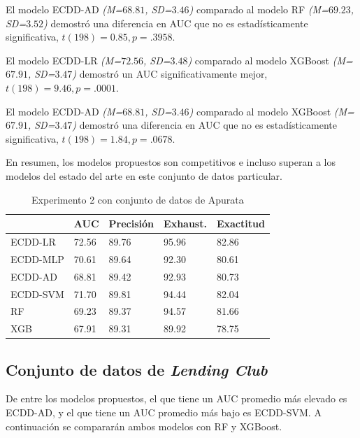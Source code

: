 El modelo ECDD-AD  \textit{(M=$68.81$, SD=$3.46$)} comparado al modelo \ac{RF} \textit{(M=$69.23$, SD=$3.52$)} demostró una diferencia en \ac{AUC} que no es estadísticamente significativa, $t(198)=0.85, p=.3958$.

El modelo ECDD-LR \textit{(M=$72.56$, SD=$3.48$)} comparado al modelo \ac{XGBoost} \textit{(M=$67.91$, SD=$3.47$)} demostró un \ac{AUC} significativamente mejor, $t(198)=9.46, p=.0001$.

El modelo ECDD-AD \textit{(M=$68.81$, SD=$3.46$)} comparado al modelo \ac{XGBoost} \textit{(M=$67.91$, SD=$3.47$)} demostró una diferencia en \ac{AUC} que no es estadísticamente significativa, $t(198)=1.84, p=.0678$.

En resumen, los modelos propuestos son competitivos e incluso superan a los modelos del estado del arte en este conjunto de datos particular.

\begin{table}[htbp]
\centering
\caption{Experimento 2 con conjunto de datos de Apurata}
\label{tab:apurata-proc2}
\begin{tabularx}{0.75\textwidth}{|l|Y Y Y Y|}
				\hline
				& AUC		& Precisión	& Exhaust.		& Exactitud	\\
				\hline
ECDD-LR			& 72.56		& 89.76		& 95.96			& 82.86		\\		%
ECDD-MLP	 	& 70.61		& 89.64		& 92.30			& 80.61		\\		%
ECDD-AD			& 68.81		& 89.42		& 92.93			& 80.73		\\		%
ECDD-SVM	 	& 71.70		& 89.81		& 94.44			& 82.04		\\		%
				\hline
RF		 		& 69.23		& 89.37		& 94.57			& 81.66		\\		%
XGB				& 67.91		& 89.31		& 89.92			& 78.75		\\		%
				\hline
\end{tabularx}
\end{table}

\subsection{Conjunto de datos de \textit{Lending Club}}

De entre los modelos propuestos, el que tiene un \ac{AUC} promedio más elevado es ECDD-AD, y el que tiene un \ac{AUC} promedio más bajo es ECDD-SVM. A continuación se compararán ambos modelos con \ac{RF} y \ac{XGBoost}.

